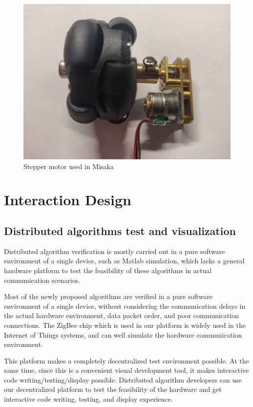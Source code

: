 \documentclass[sigconf]{acmart}
\begin{document}
\begin{figure}[h]
  \centering
  \includegraphics[width=\linewidth]{Motor-Step-1.jpg}
  \caption{Stepper motor used in Misaka}
  \label{fig:Motor}
\end{figure}

\section{Interaction Design}

\subsection{Distributed algorithms test and visualization}

Distributed algorithm verification is mostly carried out in a pure software environment of a single device, such as Matlab simulation, which lacks a general hardware platform to test the feasibility of these algorithms in actual communication scenarios.

Most of the newly proposed algorithms are verified in a pure software environment of a single device, without considering the communication delays in the actual hardware environment, data packet order, and poor communication connections. The ZigBee chip which is used in our platform is widely used in the Internet of Things systems, and can well simulate the hardware communication environment.

This platform makes a completely decentralized test environment possible. At the same time, since this is a convenient visual development tool, it makes interactive code writing/testing/display possible. Distributed algorithm developers can use our decentralized platform to test the feasibility of the hardware and get interactive code writing, testing, and display experience.
\end{document}
